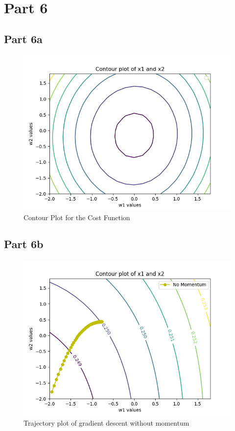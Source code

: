 \documentclass[10pt,letterpaper]{article}
\begin{document}
	\section{Part 6}
	\subsection*{Part 6a}
	\begin{figure}[H]
		\centering
		\includegraphics[width=0.7\linewidth]{part_6a_contour_plot}
		\caption{Contour Plot for the Cost Function}
		\label{fig:part6contourplot}
	\end{figure}

	\subsection*{Part 6b}
	\begin{figure}[H]
		\centering
		\includegraphics[width=\linewidth]{part6_contour_plot_with_trajectory-nomomentum}
		\caption{Trajectory plot of gradient descent without momentum}
		\label{fig:part6contourplotwithtrajectory-nomomentum}
	\end{figure}
\end{document}
